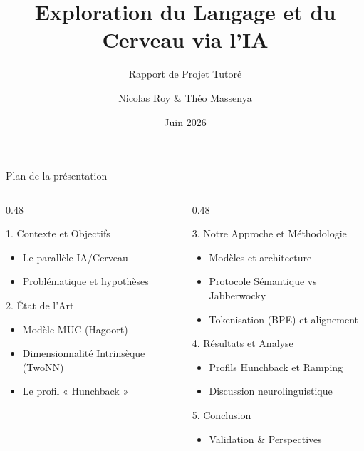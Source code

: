 \documentclass[t, aspectratio=169]{beamer}
\title{Exploration du Langage et du Cerveau via l'IA}
\subtitle{Rapport de Projet Tutoré}
\author{Nicolas Roy \& Théo Massenya}
\institute{Sous la direction de : Mme Revekka KYRIAKOGLOU\\Université Paris 8}
\date{Juin 2026}
\begin{document}
\titleframe

\begin{frame}{Plan de la présentation}
  \vspace{0.3cm}
  \begin{columns}[t]
    \begin{column}{0.48\textwidth}
      \begin{block}{1. Contexte et Objectifs}
        \scriptsize
        \begin{itemize}
          \item Le parallèle IA/Cerveau
          \item Problématique et hypothèses
        \end{itemize}
      \end{block}
      
      \begin{block}{2. État de l'Art}
        \scriptsize
        \begin{itemize}
          \item Modèle MUC (Hagoort)
          \item Dimensionnalité Intrinsèque (TwoNN)
          \item Le profil « Hunchback »
        \end{itemize}
      \end{block}
    \end{column}
    
    \begin{column}{0.48\textwidth}
      \begin{block}{3. Notre Approche et Méthodologie}
        \scriptsize
        \begin{itemize}
          \item Modèles et architecture
          \item Protocole Sémantique vs Jabberwocky
          \item Tokenisation (BPE) et alignement
        \end{itemize}
      \end{block}
      
      \begin{block}{4. Résultats et Analyse}
        \scriptsize
        \begin{itemize}
          \item Profils Hunchback et Ramping
          \item Discussion neurolinguistique
        \end{itemize}
      \end{block}
      
      \begin{block}{5. Conclusion}
        \scriptsize
        \begin{itemize}
          \item Validation \& Perspectives
        \end{itemize}
      \end{block}
    \end{column}
  \end{columns}
\end{frame}
\end{document}
